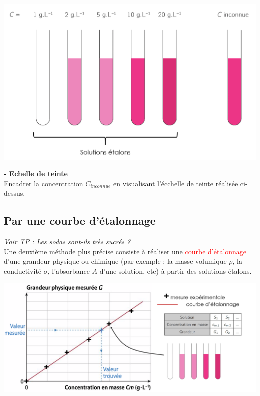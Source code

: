 \begin{center}
    \includegraphics[scale=0.45]{Images/Echelle_teinte.png}
\end{center}

\begin{mdframed}[style=autreexo]
\textbf{ - Echelle de teinte}\\
Encadrer la concentration $C_{inconnue}$ en visualisant l'écchelle de teinte réalisée ci-dessus.
\end{mdframed}


\subsection{Par une courbe d'étalonnage}
\begin{Large}
\end{Large}\textit{Voir TP : Les sodas sont-ils très sucrés ?}\\
Une deuxième méthode plus précise consiste à réaliser une \textcolor{red}{courbe d'étalonnage} d'une grandeur physique ou chimique (par exemple : la masse volumique $\rho$, la conductivité $\sigma$, l'absorbance $A$ d'une solution, etc) à partir des solutions étalons.

\begin{center}
    \includegraphics[scale=0.6]{Images/Courbe_etalonnage.png}
\end{center}

